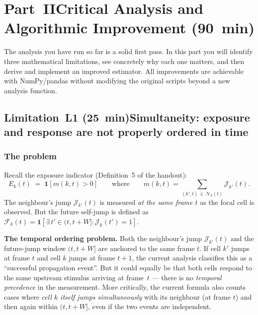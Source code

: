 \documentclass[11pt,a4paper]{article}
\theoremstyle{definition}
\newcommand{\Nb}[2]{\mathcal{N}_{#1}(#2)}
\newcommand{\JE}[2]{\mathcal{J}_{#1}(#2)}
\newcommand{\FJ}[2]{\mathcal{F}_{#1}(#2)}
\newcommand{\expo}[2]{E_{#1}(#2)}
\newcommand{\1}[1]{\mathbf{1}\!\left[#1\right]}
\begin{document}
\newpage
\section*{Part~II\quad Critical Analysis and Algorithmic Improvement (90~min)}

\noindent The analysis you have run so far is a solid first pass.
In this part you will identify three mathematical limitations, see concretely
why each one matters, and then derive and implement an improved estimator.
All improvements are achievable with NumPy/pandas without modifying the
original scripts beyond a new analysis function.

\subsection*{Limitation~L1 (25~min)\quad Simultaneity: exposure and response
  are not properly ordered in time}

\subsubsection*{The problem}

Recall the exposure indicator (Definition~5 of the handout):
\[
  \expo{k}{t} \;=\; \1{m(k,t) > 0}
  \qquad\text{where}\qquad
  m(k,t) = \sum_{(k',t)\,\in\,\Nb{k}{t}} \JE{k'}{t}.
\]
The neighbour's jump $\JE{k'}{t}$ is measured \emph{at the same frame $t$}
as the focal cell is observed.
But the future self-jump is defined as
$\FJ{k}{t} = \1{\exists\, t' \in (t, t{+}W] : \JE{k}{t'}=1}$.

\medskip
\noindent\textbf{The temporal ordering problem.}
Both the neighbour's jump $\JE{k'}{t}$ and the future-jump window
$(t, t{+}W]$ are anchored to the same frame $t$.
If cell $k'$ jumps at frame $t$ and cell $k$ jumps at frame $t+1$, the
current analysis classifies this as a ``successful propagation event''.
But it could equally be that both cells respond to the same upstream stimulus
arriving at frame~$t$ --- there is no \emph{temporal precedence} in the
measurement.
More critically, the current formula also counts cases where \emph{cell $k$
itself jumps simultaneously} with its neighbour (at frame $t$) and then again
within $(t, t+W]$, even if the two events are independent.
\end{document}
